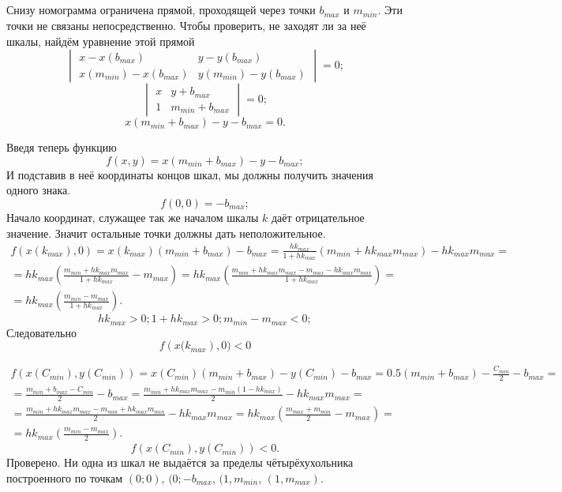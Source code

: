 \subparagraph{}Снизу номограмма ограничена прямой, проходящей через точки $b_{max}$ и $m_{min}$. Эти точки не связаны непосредственно. Чтобы проверить, не заходят ли за неё шкалы, найдём уравнение этой прямой
$$
\begin{vmatrix}
	x - x(b_{max}) & y - y(b_{max}) \\
	x(m_{min}) - x(b_{max}) & y(m_{min}) - y(b_{max})
\end{vmatrix} 
= 0;$$
$$\begin{vmatrix}
	x & y + b_{max} \\
	1 & m_{min} + b_{max}
\end{vmatrix} = 0;$$
$$x (m_{min} + b_{max}) - y - b_{max} = 0.$$

Введя теперь функцию 
$$f(x, y) = x (m_{min} + b_{max}) - y - b_{max};$$
И подставив в неё координаты концов шкал, мы должны получить значения одного знака.
$$f(0, 0) = - b_{max};$$
Начало координат, служащее так же началом шкалы $k$ даёт отрицательное значение. Значит остальные точки должны дать неположительное.
$$
\begin{gathered}
f\left(x(k_{max}), 0\right) 
	= x(k_{max}) (m_{min} + b_{max}) - b_{max}
	= \frac{h k_{max}}{1+h k_{max}} \left(m_{min} + h k_{max} m_{max} \right) - h k_{max} m_{max}
	= \\
	= h k_{max} \left( \frac{m_{min} + h k_{max} m_{max}}{1+h k_{max}} - m_{max} \right)
	= h k_{max} \left( \frac{m_{min} + h k_{max} m_{max} - m_{max} - h k_{max} m_{max} }{1+h k_{max}}  \right)
	= \\
	= h k_{max} \left( \frac{m_{min} - m_{max} }{1+h k_{max}}  \right).
\end{gathered}
$$
$$h k_{max} >0; 1+h k_{max} > 0; m_{min} - m_{max} <0;$$
Следовательно
$$f\left(x(k_{max}\right), 0) < 0$$

$$
\begin{gathered}
f\left(x(C_{min}),y(C_{min})\right) 
	= x(C_{min}) (m_{min} + b_{max}) - y(C_{min}) - b_{max}
	= 0.5 (m_{min} + b_{max}) - \frac{C_{min}}{2} - b_{max}
	= \\
	= \frac{m_{min} + b_{max} - C_{min}}{2} - b_{max}
	= \frac{m_{min} + h k_{max} m_{max} - m_{min} \left( 1 - hk_{max} \right )}{2} - h k_{max} m_{max}
	= \\
	= \frac{m_{min} + h k_{max} m_{max} - m_{min} + hk_{max}m_{min}}{2} - h k_{max} m_{max}
	= h k_{max}\left(\frac{m_{max} + m_{min}}{2} - m_{max} \right)
	= \\
	= h k_{max}\left(\frac{m_{min} - m_{max}}{2} \right).
\end{gathered}
$$
$$f\left(x(C_{min}),y(C_{min})\right) <0.$$
Проверено. Ни одна из шкал не выдаётся за пределы чётырёхухольника построенного по точкам
$(0; 0)$, $(0; -b_{max}$, $(1, m_{min}$, $(1, m_{max})$.
